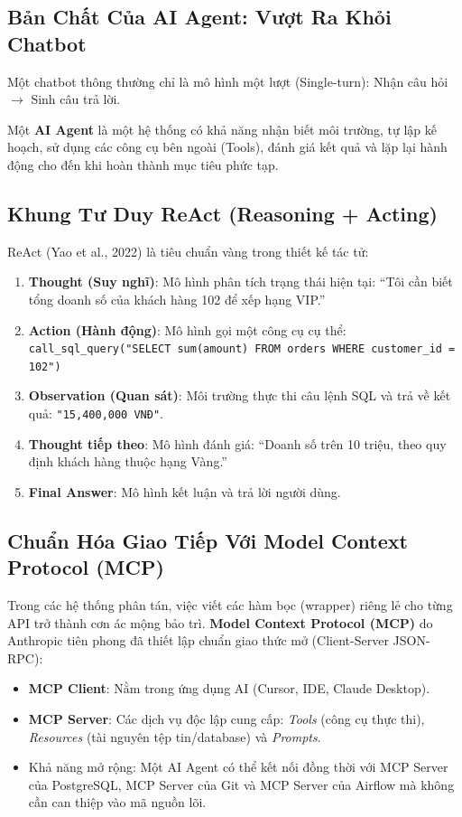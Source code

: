\subsection{Bản Chất Của AI Agent: Vượt Ra Khỏi Chatbot}
Một chatbot thông thường chỉ là mô hình một lượt (Single-turn): Nhận câu hỏi $\rightarrow$ Sinh câu trả lời. 

Một \textbf{AI Agent} là một hệ thống có khả năng nhận biết môi trường, tự lập kế hoạch, sử dụng các công cụ bên ngoài (Tools), đánh giá kết quả và lặp lại hành động cho đến khi hoàn thành mục tiêu phức tạp.

\subsection{Khung Tư Duy ReAct (Reasoning + Acting)}
ReAct (Yao et al., 2022) là tiêu chuẩn vàng trong thiết kế tác tử:
\begin{enumerate}
    \item \textbf{Thought (Suy nghĩ)}: Mô hình phân tích trạng thái hiện tại: ``Tôi cần biết tổng doanh số của khách hàng 102 để xếp hạng VIP.''
    \item \textbf{Action (Hành động)}: Mô hình gọi một công cụ cụ thể: \texttt{call\_sql\_query("SELECT sum(amount) FROM orders WHERE customer\_id = 102")}
    \item \textbf{Observation (Quan sát)}: Môi trường thực thi câu lệnh SQL và trả về kết quả: \texttt{"15,400,000 VNĐ"}.
    \item \textbf{Thought tiếp theo}: Mô hình đánh giá: ``Doanh số trên 10 triệu, theo quy định khách hàng thuộc hạng Vàng.''
    \item \textbf{Final Answer}: Mô hình kết luận và trả lời người dùng.
\end{enumerate}

\subsection{Chuẩn Hóa Giao Tiếp Với Model Context Protocol (MCP)}
Trong các hệ thống phân tán, việc viết các hàm bọc (wrapper) riêng lẻ cho từng API trở thành cơn ác mộng bảo trì. \textbf{Model Context Protocol (MCP)} do Anthropic tiên phong đã thiết lập chuẩn giao thức mở (Client-Server JSON-RPC):
\begin{itemize}
    \item \textbf{MCP Client}: Nằm trong ứng dụng AI (Cursor, IDE, Claude Desktop).
    \item \textbf{MCP Server}: Các dịch vụ độc lập cung cấp: \textit{Tools} (công cụ thực thi), \textit{Resources} (tài nguyên tệp tin/database) và \textit{Prompts}.
    \item Khả năng mở rộng: Một AI Agent có thể kết nối đồng thời với MCP Server của PostgreSQL, MCP Server của Git và MCP Server của Airflow mà không cần can thiệp vào mã nguồn lõi.
\end{itemize}

